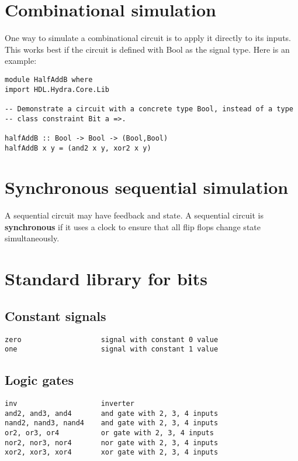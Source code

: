 \documentclass[11pt]{article}
\begin{document}
\section{Combinational simulation}
\label{sec:orgae47386}

One way to simulate a combinational circuit is to apply it directly to
its inputs.  This works best if the circuit is defined with Bool as
the signal type.   Here is an example:

\begin{verbatim}
module HalfAddB where
import HDL.Hydra.Core.Lib

-- Demonstrate a circuit with a concrete type Bool, instead of a type
-- class constraint Bit a =>.

halfAddB :: Bool -> Bool -> (Bool,Bool)
halfAddB x y = (and2 x y, xor2 x y)
\end{verbatim}

\section{Synchronous sequential simulation}
\label{sec:org865ec33}

A sequential circuit may have feedback and state.  A sequential
circuit is \textbf{synchronous} if it uses a clock to ensure that all flip
flops change state simultaneously.

\section{Standard library for bits}
\label{sec:org3df3ce7}

\subsection{Constant signals}
\label{sec:org28493fe}

\begin{verbatim}
zero                   signal with constant 0 value
one                    signal with constant 1 value
\end{verbatim}

\subsection{Logic gates}
\label{sec:org775307e}

\begin{verbatim}
inv                    inverter
and2, and3, and4       and gate with 2, 3, 4 inputs
nand2, nand3, nand4    and gate with 2, 3, 4 inputs
or2, or3, or4          or gate with 2, 3, 4 inputs
nor2, nor3, nor4       nor gate with 2, 3, 4 inputs
xor2, xor3, xor4       xor gate with 2, 3, 4 inputs
\end{verbatim}
\end{document}
